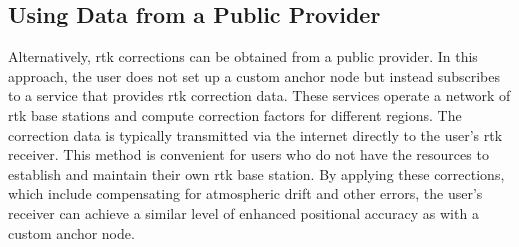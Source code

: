 \subsection{Using Data from a Public Provider}
Alternatively, \acrshort{rtk} corrections can be obtained from a public provider.
In this approach, the user does not set up a custom anchor node but instead subscribes to a service that provides \acrshort{rtk} correction data.
These services operate a network of \acrshort{rtk} base stations and compute correction factors for different regions.
The correction data is typically transmitted via the internet directly to the user's \acrshort{rtk} receiver.
This method is convenient for users who do not have the resources to establish and maintain their own \acrshort{rtk} base station.
By applying these corrections, which include compensating for atmospheric drift and other errors,
the user's receiver can achieve a similar level of enhanced positional accuracy as with a custom anchor node.

\clearpage
